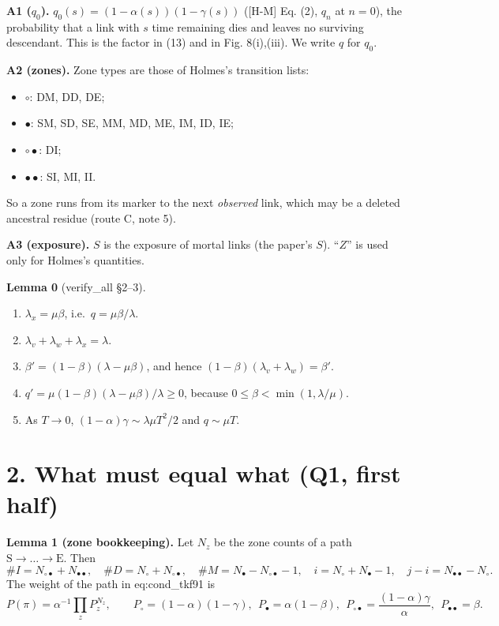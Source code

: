 \documentclass[10pt,]{article}
\providecommand{\tightlist}{%
  \setlength{\itemsep}{0pt}\setlength{\parskip}{0pt}}
\begin{document}
\textbf{A1 (\(q_0\)).} \(q_0(s)=(1-\alpha(s))(1-\gamma(s))\) ({[}H-M{]}
Eq. (2), \(q_n\) at \(n=0\)), the probability that a link with \(s\)
time remaining dies and leaves no surviving descendant. This is the
factor in (13) and in Fig. 8(i),(iii). We write \(q\) for \(q_0\).

\textbf{A2 (zones).} Zone types are those of Holmes's transition lists:

\begin{itemize}
\tightlist
\item
  \(\circ\): DM, DD, DE;
\item
  \(\bullet\): SM, SD, SE, MM, MD, ME, IM, ID, IE;
\item
  \(\circ\bullet\): DI;
\item
  \(\bullet\bullet\): SI, MI, II.
\end{itemize}

So a zone runs from its marker to the next \emph{observed} link, which
may be a deleted ancestral residue (route C, note 5).

\textbf{A3 (exposure).} \(S\) is the exposure of mortal links (the
paper's \(S\)). ``\(Z\)'' is used only for Holmes's quantities.

\textbf{Lemma 0} (verify\_all §2--3).

\begin{enumerate}
\def\labelenumi{(\alph{enumi})}
\item
  \(\lambda_x=\mu\beta\), i.e.~\(q=\mu\beta/\lambda\).
\item
  \(\lambda_v+\lambda_w+\lambda_x=\lambda\).
\item
  \(\beta'=(1-\beta)(\lambda-\mu\beta)\), and hence
  \((1-\beta)(\lambda_v+\lambda_w)=\beta'\).
\item
  \(q'=\mu(1-\beta)(\lambda-\mu\beta)/\lambda\ge0\), because
  \(0\le\beta<\min(1,\lambda/\mu)\).
\item
  As \(T\to0\), \((1-\alpha)\gamma\sim\lambda\mu T^2/2\) and
  \(q\sim\mu T\).
\end{enumerate}

\hypertarget{what-must-equal-what-q1-first-half}{%
\section{2. What must equal what (Q1, first
half)}\label{what-must-equal-what-q1-first-half}}

\textbf{Lemma 1 (zone bookkeeping).} Let \(N_z\) be the zone counts of a
path \(\mathrm S\to\dots\to\mathrm E\). Then
\[\#I=N_{\circ\bullet}+N_{\bullet\bullet},\quad \#D=N_\circ+N_{\circ\bullet},\quad \#M=N_\bullet-N_{\circ\bullet}-1,\quad i=N_\circ+N_\bullet-1,\quad j-i=N_{\bullet\bullet}-N_\circ .\]
The weight of the path in eq:cond\_tkf91 is
\[P(\pi)=\alpha^{-1}\prod_zP_z^{N_z},\qquad P_\circ=(1-\alpha)(1-\gamma),\ \ P_\bullet=\alpha(1-\beta),\ \ P_{\circ\bullet}=\frac{(1-\alpha)\gamma}{\alpha},\ \ P_{\bullet\bullet}=\beta .\]
\end{document}
